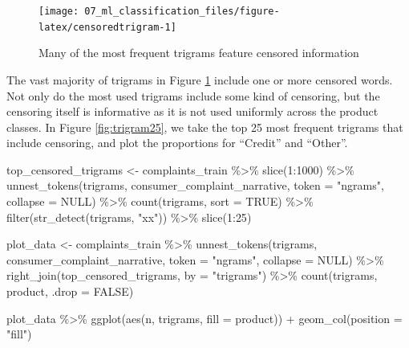 \documentclass[
]{krantz}
\makeatletter
\newenvironment{Shaded}{\begin{snugshade}}{\end{snugshade}}
\newcommand{\AttributeTok}[1]{\textcolor[rgb]{0.77,0.63,0.00}{#1}}
\newcommand{\ConstantTok}[1]{\textcolor[rgb]{0.00,0.00,0.00}{#1}}
\newcommand{\DecValTok}[1]{\textcolor[rgb]{0.00,0.00,0.81}{#1}}
\newcommand{\FunctionTok}[1]{\textcolor[rgb]{0.00,0.00,0.00}{#1}}
\newcommand{\NormalTok}[1]{#1}
\newcommand{\OtherTok}[1]{\textcolor[rgb]{0.56,0.35,0.01}{#1}}
\newcommand{\SpecialCharTok}[1]{\textcolor[rgb]{0.00,0.00,0.00}{#1}}
\newcommand{\StringTok}[1]{\textcolor[rgb]{0.31,0.60,0.02}{#1}}
\newenvironment{kframe}{%
\medskip{}
\setlength{\fboxsep}{.8em}
 \def\at@end@of@kframe{}%
 \ifinner\ifhmode%
  \def\at@end@of@kframe{\end{minipage}}%
  \begin{minipage}{\columnwidth}%
 \fi\fi%
 \def\FrameCommand##1{\hskip\@totalleftmargin \hskip-\fboxsep
 \colorbox{shadecolor}{##1}\hskip-\fboxsep
     \hskip-\linewidth \hskip-\@totalleftmargin \hskip\columnwidth}%
 \MakeFramed {\advance\hsize-\width
   \@totalleftmargin\z@ \linewidth\hsize
   \@setminipage}}%
 {\par\unskip\endMakeFramed%
 \at@end@of@kframe}
\renewenvironment{Shaded}{\begin{kframe}}{\end{kframe}}
\makeatother
\begin{document}
\begin{figure}

{\centering \texttt{[image: 07\_ml\_classification\_files/figure-latex/censoredtrigram-1]} 

}

\caption{Many of the most frequent trigrams feature censored information}\label{fig:censoredtrigram}
\end{figure}

The vast majority of trigrams in Figure \ref{fig:censoredtrigram} include one or more censored words.
Not only do the most used trigrams include some kind of censoring,
but the censoring itself is informative as it is not used uniformly across the product classes.
In Figure \ref{fig:trigram25}, we take the top 25 most frequent trigrams that include censoring,
and plot the proportions for ``Credit'' and ``Other''.

\begin{Shaded}
\begin{Highlighting}[]
\NormalTok{top\_censored\_trigrams }\OtherTok{\textless{}{-}}\NormalTok{ complaints\_train }\SpecialCharTok{\%\textgreater{}\%}
  \FunctionTok{slice}\NormalTok{(}\DecValTok{1}\SpecialCharTok{:}\DecValTok{1000}\NormalTok{) }\SpecialCharTok{\%\textgreater{}\%}
  \FunctionTok{unnest\_tokens}\NormalTok{(trigrams, }
\NormalTok{                consumer\_complaint\_narrative, }\AttributeTok{token =} \StringTok{"ngrams"}\NormalTok{,}
                \AttributeTok{collapse =} \ConstantTok{NULL}\NormalTok{) }\SpecialCharTok{\%\textgreater{}\%}
  \FunctionTok{count}\NormalTok{(trigrams, }\AttributeTok{sort =} \ConstantTok{TRUE}\NormalTok{) }\SpecialCharTok{\%\textgreater{}\%}
  \FunctionTok{filter}\NormalTok{(}\FunctionTok{str\_detect}\NormalTok{(trigrams, }\StringTok{"xx"}\NormalTok{)) }\SpecialCharTok{\%\textgreater{}\%}
  \FunctionTok{slice}\NormalTok{(}\DecValTok{1}\SpecialCharTok{:}\DecValTok{25}\NormalTok{)}

\NormalTok{plot\_data }\OtherTok{\textless{}{-}}\NormalTok{ complaints\_train }\SpecialCharTok{\%\textgreater{}\%}
  \FunctionTok{unnest\_tokens}\NormalTok{(trigrams, }
\NormalTok{                consumer\_complaint\_narrative, }\AttributeTok{token =} \StringTok{"ngrams"}\NormalTok{,}
                \AttributeTok{collapse =} \ConstantTok{NULL}\NormalTok{) }\SpecialCharTok{\%\textgreater{}\%}
  \FunctionTok{right\_join}\NormalTok{(top\_censored\_trigrams, }\AttributeTok{by =} \StringTok{"trigrams"}\NormalTok{) }\SpecialCharTok{\%\textgreater{}\%}
  \FunctionTok{count}\NormalTok{(trigrams, product, }\AttributeTok{.drop =} \ConstantTok{FALSE}\NormalTok{)}

\NormalTok{plot\_data }\SpecialCharTok{\%\textgreater{}\%}
  \FunctionTok{ggplot}\NormalTok{(}\FunctionTok{aes}\NormalTok{(n, trigrams, }\AttributeTok{fill =}\NormalTok{ product)) }\SpecialCharTok{+}
  \FunctionTok{geom\_col}\NormalTok{(}\AttributeTok{position =} \StringTok{"fill"}\NormalTok{)}
\end{Highlighting}
\end{Shaded}
\end{document}
